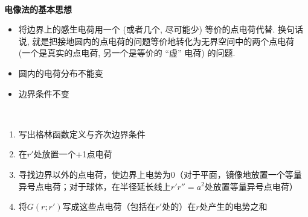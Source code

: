 $\ $

\noindent\textbf{电像法的基本思想}
\begin{itemize}
    \item 将边界上的感生电荷用一个 (或者几个, 尽可能少) 等价的点电荷代替. 换句话说, 就是把接地圆内的点电荷的问题等价地转化为无界空间中的两个点电荷 (一个是真实的点电荷, 另一个是等价的 “虚” 电荷) 的问题.
    \item 圆内的电荷分布不能变
    \item 边界条件不变
\end{itemize}


\begin{mtd}[电像法解题步骤]$\ $
    \begin{enumerate}
        \item 写出格林函数定义与齐次边界条件
        \item 在$r'$处放置一个+1点电荷
        \item 寻找边界以外的点电荷，使边界上电势为0（对于平面，镜像地放置一个等量异号点电荷；对于球体，在半径延长线上$r'r''=a^2$处放置等量异号点电荷）
        \item 将$G(r;r')$写成这些点电荷（包括在$r'$处的）在$r$处产生的电势之和
    \end{enumerate}
\end{mtd}


